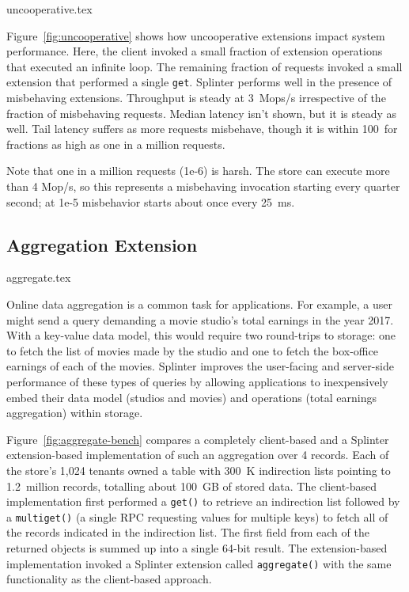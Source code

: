  {uncooperative.tex}

Figure~\ref{fig:uncooperative} shows how uncooperative
  extensions impact system performance. Here, the client invoked a
  small fraction of extension operations that executed an infinite
  loop.
The remaining fraction of requests invoked a small extension that performed a
  single \texttt{get}.
Splinter performs well in the presence of misbehaving extensions.
Throughput is steady at 3~Mops/s
  irrespective of the fraction of misbehaving requests.
Median latency isn't shown, but it is steady as well.
Tail latency suffers as more requests misbehave, though it is within
  100~\us for fractions as high as one in a million requests.

Note that one in a million requests (1e-6) is harsh.
The store can execute more than 4 Mop/s, so this represents a misbehaving
  invocation starting every quarter second; at 1e-5 misbehavior starts about once
  every 25~ms.

\subsection{Aggregation Extension}
\label{sec:eval-agg}

 {aggregate.tex}

Online data aggregation is a common task for applications.
For example, a user might send a query
  demanding a movie studio's total earnings in the year 2017.
With a key-value data model, this would require two
  round-trips to storage:
one to fetch the list of movies made
  by the studio and one to fetch the box-office earnings of each
  of the movies.
Splinter improves the user-facing and server-side performance of these types of
  queries by allowing applications to inexpensively embed their data model
  (studios and movies) and operations (total earnings aggregation) within
  storage.

Figure~\ref{fig:aggregate-bench} compares a completely client-based and a
  Splinter extension-based implementation of such an aggregation over 4
  records.
Each of the store's 1,024 tenants owned a table with 300~K
  indirection lists pointing to 1.2~million records, totalling about 100~GB of
  stored data.
The client-based implementation first performed a \texttt{get()} to
  retrieve an indirection list followed by a \texttt{multiget()} (a single RPC
  requesting values for multiple keys) to fetch all of the records indicated in
  the indirection list.
The first field from each of the returned objects is summed up into a single
  64-bit result.
The extension-based implementation invoked a Splinter extension called
  \texttt{aggregate()} with the same functionality as the client-based approach.

